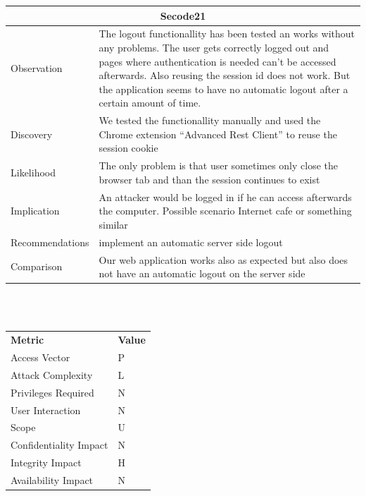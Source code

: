 \documentclass[headsepline,footsepline,footinclude=false,oneside,fontsize=11pt,paper=a4,listof=totoc,bibliography=totoc]{scrbook} %
\begin{document}
\begin{tabular}{ l|p{11cm}  }
	\hline
	\multicolumn{2}{c}{\textbf{Secode21}} \\
	\hline
	Observation & The logout functionallity has been tested an works without any problems.
	The user gets correctly logged out and pages where authentication is needed can't be accessed afterwards.
	Also reusing the session id does not work. But the application seems to have no automatic
	logout after a certain amount of time.\\
	Discovery & We tested the functionallity manually and used the Chrome extension ``Advanced Rest Client''
	to reuse the session cookie \\
	Likelihood & The only problem is that user sometimes only close the browser tab and than the session continues to exist\\
	Implication & An attacker would be logged in if he can access afterwards the computer. Possible scenario Internet cafe
	or something similar\\
	Recommendations & implement an automatic server side logout\\
	Comparison & Our web application works also as expected but also does not have an automatic logout on the server side\\
	\hline
\end{tabular}
\\
\vspace{0.5cm}
\\
\begin{center}
	\begin{tabular}{ll}
		\rowcolor[HTML]{34CDF9}
		{\color[HTML]{ECF4FF} \textbf{Metric}}        & {\color[HTML]{ECF4FF} \textbf{Value}} \\
		\rowcolor[HTML]{BBDAFF}
		{\color[HTML]{333333} Access Vector}          & {\color[HTML]{333333} } P             \\
		\rowcolor[HTML]{ECF4FF}
		{\color[HTML]{333333} Attack Complexity}      & {\color[HTML]{333333} } L              \\
		\rowcolor[HTML]{BBDAFF}
		{\color[HTML]{333333} Privileges Required}    & {\color[HTML]{333333} } N              \\
		\rowcolor[HTML]{ECF4FF}
		{\color[HTML]{333333} User Interaction}       & {\color[HTML]{333333} } N              \\
		\rowcolor[HTML]{BBDAFF}
		{\color[HTML]{333333} Scope}                  & {\color[HTML]{333333} } U              \\
		\rowcolor[HTML]{ECF4FF}
		{\color[HTML]{333333} Confidentiality Impact} & {\color[HTML]{333333} } N              \\
		\rowcolor[HTML]{BBDAFF}
		{\color[HTML]{333333} Integrity Impact}       & {\color[HTML]{333333} } H              \\
		\rowcolor[HTML]{ECF4FF}
		{\color[HTML]{333333} Availability Impact}    & {\color[HTML]{333333} } N
	\end{tabular}
\end{center}
\end{document}
